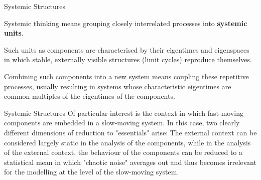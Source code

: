 \documentclass{beamer}
\title{Modelling Sustainable Systems\\ and Semantic Web\\[6pt]
  Digital Spaces of Action
  \vskip1em}
\subtitle{Lecture in the Module 10-202-2309\\ for Master Computer Science}
\author{Prof. Dr. Hans-Gert Gräbe\\
\url{http://www.informatik.uni-leipzig.de/~graebe}}
\date{November 2021}
\begin{document}
{
\begin{frame}
  \titlepage
\end{frame}}

\begin{frame}{Systemic Structures}

Systemic thinking means grouping closely interrelated processes into
\textbf{systemic units}.

Such units as components are characterised by their eigentimes and eigenspaces
in which stable, externally visible structures (limit cycles) reproduce
themselves.

Combining such components into a new system means coupling these repetitive
processes, usually resulting in systems whose characteristic eigentimes are
common multiples of the eigentimes of the components.

\end{frame}

\begin{frame}{Systemic Structures}
Of particular interest is the context in which fast-moving components are
embedded in a slow-moving system. In this case, two clearly different
dimensions of reduction to "essentials" arise: The external context can be
considered largely static in the analysis of the components, while in the
analysis of the external context, the behaviour of the components can be
reduced to a statistical mean in which "chaotic noise" averages out and thus
becomes irrelevant for the modelling at the level of the slow-moving system.

\end{frame}
\end{document}
